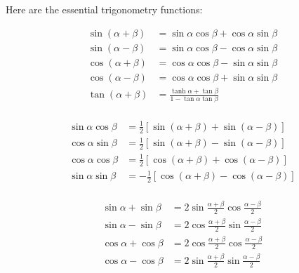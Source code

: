 \begin{theorem} 
    Here are the essential trigonometry functions:    
    
\begin{equation}
    \begin{aligned}
        \sin(\alpha + \beta) &=\sin\alpha\cos\beta + \cos\alpha\sin\beta \\
        \sin(\alpha - \beta) &=\sin\alpha\cos\beta - \cos\alpha\sin\beta \\
        \cos(\alpha + \beta) &=\cos\alpha\cos\beta - \sin\alpha\sin\beta \\
        \cos(\alpha - \beta) &=\cos\alpha\cos\beta + \sin\alpha\sin\beta \\
        \tan(\alpha+\beta) &= \frac{\tanh\alpha + \tan\beta}{1 - \tan\alpha \tan\beta} \\   
    \end{aligned}
\end{equation}


\begin{equation}
    \begin{aligned}
        \sin\alpha\cos\beta &=\frac{1}{2}[\sin(\alpha+\beta) + \sin(\alpha - \beta)] \\
        \cos\alpha\sin\beta &=\frac{1}{2}[\sin(\alpha+\beta) - \sin(\alpha - \beta)] \\
        \cos\alpha\cos\beta &=\frac{1}{2}[\cos(\alpha + \beta) + \cos(\alpha - \beta)] \\
        \sin\alpha\sin\beta &=-\frac{1}{2}[\cos(\alpha + \beta) - \cos(\alpha - \beta)] \\
    \end{aligned}
\end{equation}


\begin{equation}
    \begin{aligned}   
        \sin\alpha + \sin\beta &= 2 \sin\frac{\alpha+\beta}{2}\cos\frac{\alpha-\beta}{2} \\
        \sin\alpha - \sin\beta &= 2 \cos\frac{\alpha+\beta}{2}\sin\frac{\alpha-\beta}{2} \\
        \cos\alpha + \cos\beta &= 2 \cos\frac{\alpha+\beta}{2}\cos\frac{\alpha-\beta}{2} \\
        \cos\alpha - \cos\beta &= 2 \sin\frac{\alpha+\beta}{2}\sin\frac{\alpha-\beta}{2} \\ 
    \end{aligned}
\end{equation}



\end{theorem}

